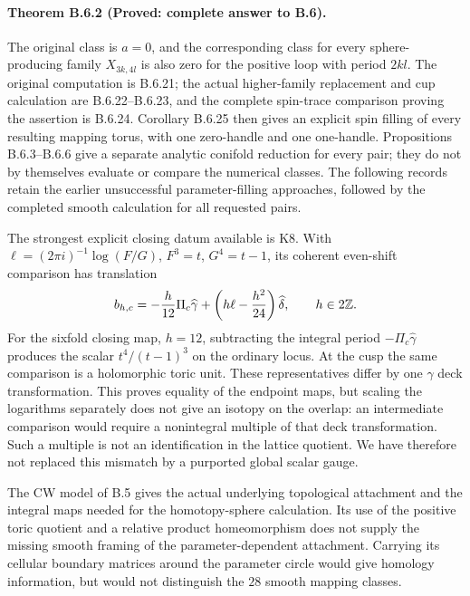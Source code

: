 \paragraph{Theorem B.6.2 (Proved: complete answer to B.6).}
The original class is $a=0$, and the corresponding class for
every sphere-producing family $X_{3k,4l}$ is also zero for
the positive loop with period $2kl$.  The original computation
is B.6.21; the actual higher-family replacement and cup
calculation are B.6.22--B.6.23, and the complete spin-trace
comparison proving the assertion is B.6.24.  Corollary B.6.25
then gives an explicit spin filling of every resulting
mapping torus, with one zero-handle and one one-handle.
Propositions B.6.3--B.6.6 give a separate analytic conifold
reduction for every pair; they do not by themselves evaluate
or compare the numerical classes.  The following records retain
the earlier unsuccessful parameter-filling approaches, followed
by the completed smooth calculation for all requested pairs.

The strongest explicit closing datum available is K8. With
$\ell=(2\pi i)^{-1}\log(F/G)$, $F^3=t$, $G^4=t-1$, its coherent
even-shift comparison has translation
\[
 b_{h,c}=-\frac h{12}\Pi_c\widehat\gamma+
          \left(h\ell-\frac{h^2}{24}\right)\widehat\delta,
 \qquad h\in2\mathbb Z.
\]
For the sixfold closing map, $h=12$, subtracting the integral period
$-\Pi_c\widehat\gamma$ produces the scalar $t^4/(t-1)^3$ on the
ordinary locus. At the cusp the same comparison is a holomorphic
toric unit. These representatives differ by one
$\widehat\gamma$ deck transformation. This proves equality of the
endpoint maps, but scaling the logarithms separately does not give
an isotopy on the overlap: an intermediate comparison would require
a nonintegral multiple of that deck transformation. Such a multiple
is not an identification in the lattice quotient. We have therefore
not replaced this mismatch by a purported global scalar gauge.

The CW model of B.5 gives the actual underlying topological attachment
and the integral maps needed for the homotopy-sphere calculation. Its
use of the positive toric quotient and a relative product
homeomorphism does not supply the missing smooth framing of the
parameter-dependent attachment. Carrying its cellular boundary
matrices around the parameter circle would give homology information,
but would not distinguish the $28$ smooth mapping classes.

